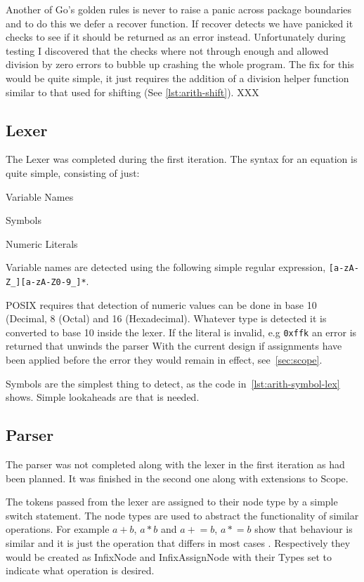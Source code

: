 Another of Go's golden rules is never to raise a panic across package boundaries and to do this we defer a recover function.
If recover detects we have panicked it checks to see if it should be returned as an error instead.
Unfortunately during testing I discovered that the checks where not through enough and allowed division by zero errors to bubble up crashing the whole program. 
The fix for this would be quite simple, it just requires the addition of a division helper function similar to that used for shifting (See \ref{lst:arith-shift}). XXX %
\newpage %
\subsection{Lexer}
The Lexer was completed during the first iteration.
The syntax for an equation is quite simple, consisting of just:
\begin{itemize*}
	\item Variable Names
    \item Symbols
	\item Numeric Literals
\end{itemize*}

Variable names are detected using the following simple regular expression, \verb![a-zA-Z_][a-zA-Z0-9_]*!.

POSIX requires that detection of numeric values can be done in base 10 (Decimal, 8 (Octal) and 16 (Hexadecimal).
Whatever type is detected it is converted to base 10 inside the lexer.
If the literal is invalid, e.g \verb!0xffk! an error is returned that unwinds the parser
With the current design if assignments have been applied before the error they would remain in effect, see~\ref{sec:scope}.

Symbols are the simplest thing to detect, as the code in~\ref{lst:arith-symbol-lex} shows.
Simple lookaheads are that is needed.

\subsection{Parser}
The parser was not completed along with the lexer in the first iteration as had been planned.
It was finished in the second one along with extensions to Scope.

The tokens passed from the lexer are assigned to their node type by a simple switch statement.
The node types are used to abstract the functionality of similar operations.
For example $a + b$, $a * b$ and $a \mathrel{+}= b$, $a \mathrel{*}= b$ show that behaviour is similar and it is just the operation that differs in most cases .
Respectively they would be created as InfixNode and InfixAssignNode with their Types set to indicate what operation is desired.

